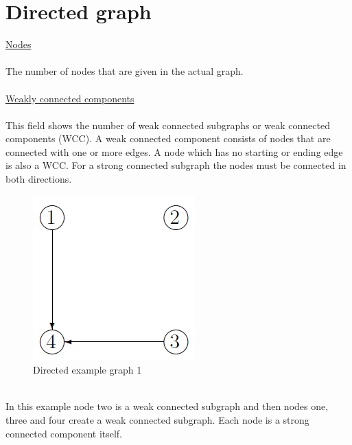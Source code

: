 \documentclass[12pt]{report}
\begin{document}
\section{Directed graph}
\underline{Nodes}\\
\\
The number of nodes that are given in the actual graph.\\
\\
\underline{Weakly connected components}\\
\\
This field shows the number of weak connected subgraphs or weak connected components (WCC). A weak connected component consists of nodes that are connected with one or more edges. A node which has no starting or ending edge is also a WCC. For a strong connected subgraph the nodes must be connected in both directions.\\
\begin{figure}[h]
\centering
\includegraphics[scale=.6]{graph3}
\caption{Directed example graph 1}
\label{FIG:abb47}
\end{figure}
\\
In this example node two is a weak connected subgraph and then nodes one, three and four create a weak connected subgraph. Each node is a strong connected component itself.\\
\\
\end{document}
